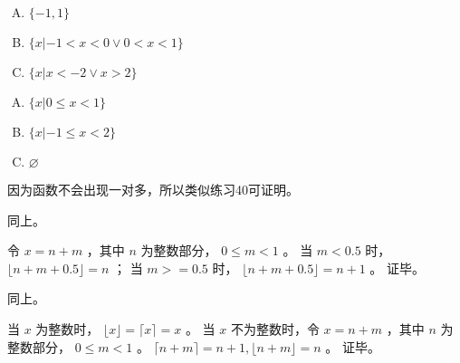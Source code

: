 {{        %
        \begin{practices}
            \begin{enumerate}[A.]
                \item $\{-1, 1\}$
                \item $\{x | -1 < x < 0 \vee 0 < x < 1\}$
                \item $\{x | x < -2 \vee x > 2\}$
            \end{enumerate}
        \end{practices}

        \begin{practices}
            \begin{enumerate}[A.]
                \item $\{x | 0 \leq x < 1\}$
                \item $\{x | -1 \leq x < 2\}$
                \item $\varnothing$
            \end{enumerate}
        \end{practices}

        \begin{practices}
            因为函数不会出现一对多，所以类似练习40可证明。
        \end{practices}

        \begin{practices}
            同上。
        \end{practices}

        \begin{practices}
            令 $x = n + m$ ，其中 $n$ 为整数部分， $0 \leq m < 1$ 。
            当 $m < 0.5$ 时， $\lfloor n + m + 0.5 \rfloor = n$ ；
            当 $m >= 0.5$ 时， $\lfloor n + m + 0.5 \rfloor = n + 1$ 。
            证毕。
        \end{practices}

        \begin{practices}
            同上。
        \end{practices}

        \begin{practices}
            当 $x$ 为整数时， $\lfloor x \rfloor = \lceil x \rceil = x$ 。
            当 $x$ 不为整数时，令 $x = n + m$ ，其中 $n$ 为整数部分， $0 \leq m < 1$ 。 $\lceil n + m \rceil = n + 1, \lfloor n + m \rfloor = n$ 。
            证毕。
        \end{practices}

}}
